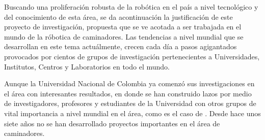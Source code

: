 {\begin{frame}
{\begin{center}
      \end{center}
    }
  \end{frame}
}
Buscando una proliferaci\'on robusta de la rob\'otica en el pa\'is a nivel tecnol\'ogico y del conocimiento de esta \'area, se da acontinuaci\'on la justificaci\'on de este proyecto de investigaci\'on, propuesta que se ve acotada a ser trabajada en el mundo de la r\'obotica de caminadores.  Las tendencias a nivel mundial que se desarrollan en este tema actu\'almente, crecen cada d\'ia a pasos agigantados provocados por cientos de grupos de investigaci\'on pertenecientes a Universidades, Institutos, Centros y Laboratorios en todo el mundo.\par
Aunque la Universidad Nacional de Colombia ya comenz\'o sus investigaciones en el \'area con interesantes resultados\cite{M2005,M2005a,Roa2006,Heredia2007}, en donde se han construido lazos por medio de investigadores, profesores y estudiantes de la Universidad con otros grupos de vital importancia a nivel mundial en el \'area, como es el caso de \cite{Englsberger2011,Ott2011,M2013}. Desde hace unos siete a\~nos no se han desarrollado proyectos importantes en el \'area de caminadores.\par
